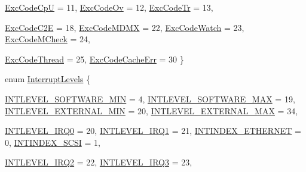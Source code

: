 \begin{DoxyCompactItemize}
\hyperlink{namespaceMipsISA_abcc8a7c57cd8becefbfd621dbff5ffd4a551171a5da226246b5531b81b1b004d1}{ExcCodeCpU} =  11, 
\hyperlink{namespaceMipsISA_abcc8a7c57cd8becefbfd621dbff5ffd4a03cfe0fdb20fb915a732611a1fb1fcd6}{ExcCodeOv} =  12, 
\hyperlink{namespaceMipsISA_abcc8a7c57cd8becefbfd621dbff5ffd4a44790335bbdd6c0676c33451ea06cab8}{ExcCodeTr} =  13, 
\par
\hyperlink{namespaceMipsISA_abcc8a7c57cd8becefbfd621dbff5ffd4a58a6a6e65e3e3b00d734aad8a31f0494}{ExcCodeC2E} =  18, 
\hyperlink{namespaceMipsISA_abcc8a7c57cd8becefbfd621dbff5ffd4ae01827ff47490fa5c78b0db611874a8b}{ExcCodeMDMX} =  22, 
\hyperlink{namespaceMipsISA_abcc8a7c57cd8becefbfd621dbff5ffd4a4e56fc38462753d0857a59296f0adaee}{ExcCodeWatch} =  23, 
\hyperlink{namespaceMipsISA_abcc8a7c57cd8becefbfd621dbff5ffd4a7ad9e166669807776748fa26d5d0be13}{ExcCodeMCheck} =  24, 
\par
\hyperlink{namespaceMipsISA_abcc8a7c57cd8becefbfd621dbff5ffd4a023acb7f13ba7dbffe8164269a921f40}{ExcCodeThread} =  25, 
\hyperlink{namespaceMipsISA_abcc8a7c57cd8becefbfd621dbff5ffd4af2545e394c9e9232ba11ed2e4987c51c}{ExcCodeCacheErr} =  30
 \}
\item 
enum \hyperlink{namespaceMipsISA_aa201d1f9b8ac67b80bdf6c08f370558c}{InterruptLevels} \{ \par
\hyperlink{namespaceMipsISA_aa201d1f9b8ac67b80bdf6c08f370558ca8db7857d98d7e42b3e02bed7c3c540ba}{INTLEVEL\_\-SOFTWARE\_\-MIN} =  4, 
\hyperlink{namespaceMipsISA_aa201d1f9b8ac67b80bdf6c08f370558ca9918551eda4baa1f4e11aaf334bb894b}{INTLEVEL\_\-SOFTWARE\_\-MAX} =  19, 
\hyperlink{namespaceMipsISA_aa201d1f9b8ac67b80bdf6c08f370558cafc78264c66a1ac704f17daa5fa9f9260}{INTLEVEL\_\-EXTERNAL\_\-MIN} =  20, 
\hyperlink{namespaceMipsISA_aa201d1f9b8ac67b80bdf6c08f370558cae599256ab529cbe8194cbdde120144f5}{INTLEVEL\_\-EXTERNAL\_\-MAX} =  34, 
\par
\hyperlink{namespaceMipsISA_aa201d1f9b8ac67b80bdf6c08f370558cadce4ff34f9aaeca71ba8d90672214bec}{INTLEVEL\_\-IRQ0} =  20, 
\hyperlink{namespaceMipsISA_aa201d1f9b8ac67b80bdf6c08f370558cad864f4251825107a9b1858c1fbc868c5}{INTLEVEL\_\-IRQ1} =  21, 
\hyperlink{namespaceMipsISA_aa201d1f9b8ac67b80bdf6c08f370558ca0fed6fcec83dc8d0bd48f50010ad9d0d}{INTINDEX\_\-ETHERNET} =  0, 
\hyperlink{namespaceMipsISA_aa201d1f9b8ac67b80bdf6c08f370558ca34f32f6cdf764c379b096e418b18f9c3}{INTINDEX\_\-SCSI} =  1, 
\par
\hyperlink{namespaceMipsISA_aa201d1f9b8ac67b80bdf6c08f370558caadce35d59b8bb4154d22aa7f6ab9036e}{INTLEVEL\_\-IRQ2} =  22, 
\hyperlink{namespaceMipsISA_aa201d1f9b8ac67b80bdf6c08f370558ca01099931d96b93a7403c65cd2ff5985d}{INTLEVEL\_\-IRQ3} =  23, 

\end{DoxyCompactItemize}
